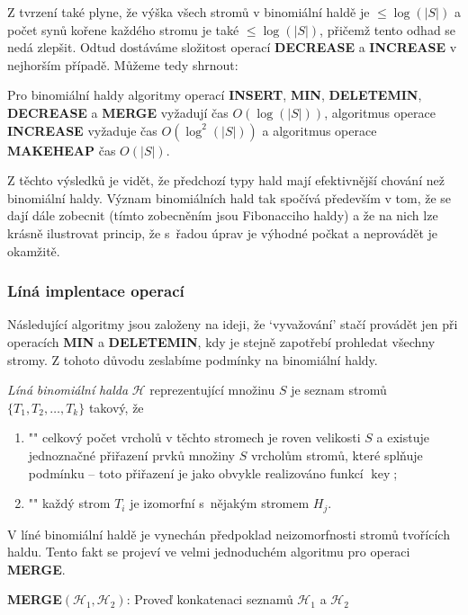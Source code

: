 \documentclass[a4paper,12pt]{article}
\DeclareMathOperator*{\key}{key}
\begin{document}
Z tvrzení také plyne, že výška všech stromů v 
binomiální haldě je $\le\log(|S|)$ a počet synů 
kořene každého stromu je 
také $\le\log(|S|)$, přičemž tento odhad se nedá zlepšit. Odtud 
dostáváme složitost operací {\bf DECREASE} a {\bf INCREASE} v nejhorším 
případě. Můžeme tedy shrnout:

\begin{veta}Pro binomiální haldy algoritmy operací 
{\bf IN\-SERT}, {\bf MIN}, {\bf DELETEMIN}, {\bf DECREASE} a {\bf MERGE  }
vy\-ža\-dují čas $O(\log(|S|))$, algoritmus operace {\bf INCRE\-ASE }
vy\-ža\-duje čas $O(\log^2(|S|))$ a algoritmus operace {\bf MAKEHEAP }čas $O(|S|)$.
\end{veta}

Z těchto výsledků je vidět, že předchozí 
typy hald mají efektivnější chování než binomiální haldy. 
Význam binomiálních hald tak spo\-čí\-vá především v 
tom, že se dají dále zobecnit (tímto zobecněním jsou Fibonacciho 
haldy) a že na nich lze krásně 
ilustrovat princip, že s~řadou úprav je výhodné počkat 
a neprovádět je okamžitě.

\subsubsection{Líná implentace operací}

Následující algoritmy jsou založeny na ideji, že 
`vyvažování' stačí provádět jen při operacích {\bf MIN} a 
{\bf DELETEMIN}, kdy je stejně zapotřebí prohledat všechny 
stromy. Z tohoto důvodu zeslabíme podmínky na 
binomiální haldy.

\emph{Líná} \emph{binomiální} \emph{halda} $\mathcal H$ 
reprezentující množinu $S$ je seznam stromů 
$\{T_1,T_2,\dots,T_k\}$ takový, že  
\begin{enumerate}
\item"{}"
celkový počet vrcholů v těchto stromech je 
roven velikosti $S$ a 
existuje jednoznačné přiřazení prvků množiny 
$S$ vrcholům stromů, které splňuje 
podmínku  -- toto přiřazení je jako obvykle 
realizováno funkcí $\key$;
\item"{}"
každý strom $T_i$ je izomorfní s~nějakým stromem $H_
j$.
\end{enumerate}

V líné binomiální haldě je vynechán předpoklad 
neizo\-morf\-nosti stromů tvořících haldu. Tento fakt se 
projeví ve velmi jednoduchém algoritmu pro operaci 
{\bf MERGE}.

{\bf MERGE$(\mathcal H_1,\mathcal H_2)$}:\newline 
Proveď konkatenaci seznamů $\mathcal H_1$ a $\mathcal H_2$
\end{document}
